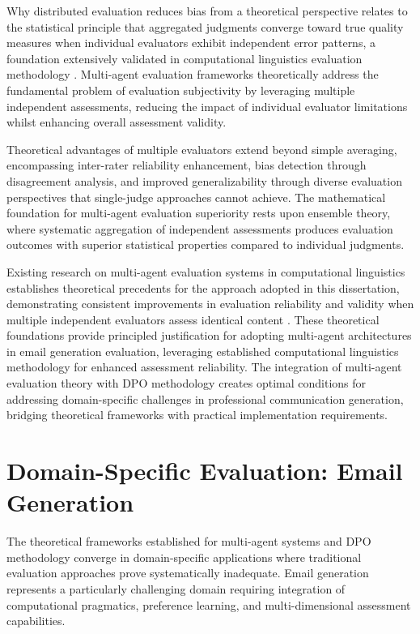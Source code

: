 Why distributed evaluation reduces bias from a theoretical perspective relates to the statistical principle that aggregated judgments converge toward true quality measures when individual evaluators exhibit independent error patterns, a foundation extensively validated in computational linguistics evaluation methodology \cite{liu2023geval, li2023generative_judge}. Multi-agent evaluation frameworks theoretically address the fundamental problem of evaluation subjectivity by leveraging multiple independent assessments, reducing the impact of individual evaluator limitations whilst enhancing overall assessment validity.

Theoretical advantages of multiple evaluators extend beyond simple averaging, encompassing inter-rater reliability enhancement, bias detection through disagreement analysis, and improved generalizability through diverse evaluation perspectives that single-judge approaches cannot achieve. The mathematical foundation for multi-agent evaluation superiority rests upon ensemble theory, where systematic aggregation of independent assessments produces evaluation outcomes with superior statistical properties compared to individual judgments.

Existing research on multi-agent evaluation systems in computational linguistics establishes theoretical precedents for the approach adopted in this dissertation, demonstrating consistent improvements in evaluation reliability and validity when multiple independent evaluators assess identical content \cite{schmidtova2024nlg_metrics, rony2022rome}. These theoretical foundations provide principled justification for adopting multi-agent architectures in email generation evaluation, leveraging established computational linguistics methodology for enhanced assessment reliability. The integration of multi-agent evaluation theory with DPO methodology creates optimal conditions for addressing domain-specific challenges in professional communication generation, bridging theoretical frameworks with practical implementation requirements.




\section{Domain-Specific Evaluation: Email Generation}

The theoretical frameworks established for multi-agent systems and DPO methodology converge in domain-specific applications where traditional evaluation approaches prove systematically inadequate. Email generation represents a particularly challenging domain requiring integration of computational pragmatics, preference learning, and multi-dimensional assessment capabilities.

